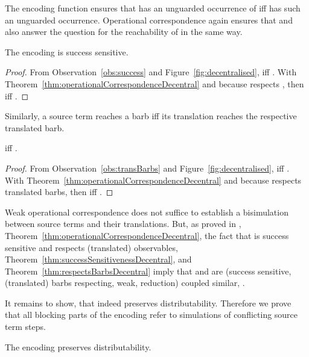 \documentclass[]{eptcs}
\begin{document}
The encoding function ensures that  has an unguarded occurrence of  iff  has such an unguarded occurrence. Operational correspondence again ensures that  and  also answer the question for the reachability of  in the same way.

\begin{theorem}
	The encoding  is success sensitive.
	\label{thm:successSensitivenessDecentral}
\end{theorem}

\begin{proof}
	From Observation~\ref{obs:success} and Figure~\ref{fig:decentralised},  iff . With Theorem~\ref{thm:operationalCorrespondenceDecentral} and because  respects , then  iff .
\end{proof}

Similarly, a source term reaches a barb iff its translation reaches the respective translated barb.

\begin{theorem}
	 iff .
	\label{thm:respectsBarbsDecentral}
\end{theorem}

\begin{proof}
	From Observation~\ref{obs:transBarbs} and Figure~\ref{fig:decentralised},  iff . With Theorem~\ref{thm:operationalCorrespondenceDecentral} and because  respects translated barbs, then  iff .
\end{proof}

Weak operational correspondence does not suffice to establish a bisimulation between source terms and their translations.
But, as proved in \cite{petersGlabbeek15}, Theorem~\ref{thm:operationalCorrespondenceDecentral}, the fact that  is success sensitive and respects (translated) observables, Theorem~\ref{thm:successSensitivenessDecentral}, and Theorem~\ref{thm:respectsBarbsDecentral} imply that  and  are (success sensitive, (translated) barbs respecting, weak, reduction) coupled similar, \ie .

It remains to show, that  indeed preserves distributability. Therefore we prove that all blocking parts of the encoding  refer to simulations of conflicting source term steps.

\begin{theorem}
	The encoding  preserves distributability.
	\label{thm:distributability}
\end{theorem}
\end{document}

